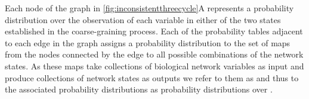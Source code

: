 Each node of the graph in \autoref{fig:inconsistentthreecycle}A represents a probability distribution over the observation of each variable in either of the two states established in the coarse-graining process.
Each of the probability tables adjacent to each edge in the graph assigns a probability distribution to the set of maps from the nodes connected by the edge to all possible combinations of the network states. As these maps take collections of biological network variables as input and produce collections of network states as outputs we refer to them as \gnpm{} and thus to the associated probability distributions as probability distributions over \gnpm{}.

